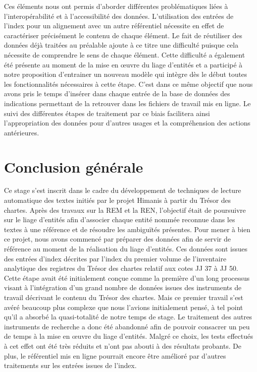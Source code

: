 \documentclass[a4paper,12pt,twoside]{book}
\begin{document}
	Ces éléments nous ont permis d'aborder différentes problématiques liées à l'interopérabilité et à l'accessibilité des données. L'utilisation des entrées de l'index pour un alignement avec un autre référentiel nécessite en effet de caractériser précisément le contenu de chaque élément. Le fait de réutiliser des données déjà traitées au préalable ajoute à ce titre une difficulté puisque cela nécessite de comprendre le sens de chaque élément. Cette difficulté a également été présente au moment de la mise en œuvre du liage d'entités et a participé à notre proposition d'entrainer un nouveau modèle qui intègre dès le début toutes les fonctionnalités nécessaires à cette étape. C'est dans ce même objectif que nous avons pris le temps d'insérer dans chaque entrée de la base de données des indications permettant de la retrouver dans les fichiers de travail mis en ligne. Le suivi des différentes étapes de traitement par ce biais facilitera ainsi l'appropriation des données pour d'autres usages et la compréhension des actions antérieures.
	
	
	\chapter*{Conclusion générale}
	
	Ce stage s'est inscrit dans le cadre du développement de techniques de lecture automatique des textes initiés par le projet Himanis à partir du Trésor des chartes. Après des travaux sur la REM et la REN, l'objectif était de poursuivre sur le liage d'entités afin d'associer chaque entité nommée reconnue dans les textes à une référence et de résoudre les ambiguïtés présentes. Pour mener à bien ce projet, nous avons commencé par préparer des données afin de servir de référence au moment de la réalisation du liage d'entités. Ces données sont issues des entrées d'index décrites par l'index du premier volume de l'inventaire analytique des registres du Trésor des chartes relatif aux cotes JJ 37 à JJ 50. Cette étape avait été initialement conçue comme la première d'un long processus visant à l'intégration d'un grand nombre de données issues des instruments de travail décrivant le contenu du Trésor des chartes. Mais ce premier travail s'est avéré beaucoup plus complexe que nous l'avions initialement pensé, à tel point qu'il a absorbé la quasi-totalité de notre temps de stage. Le traitement des autres instruments de recherche a donc été abandonné afin de pouvoir consacrer un peu de temps à la mise en œuvre du liage d'entités. Malgré ce choix, les tests effectués à cet effet ont été très réduits et n'ont pas abouti à des résultats probants. De plus, le référentiel mis en ligne pourrait encore être amélioré par d'autres traitements sur les entrées issues de l'index.
	
\end{document}
